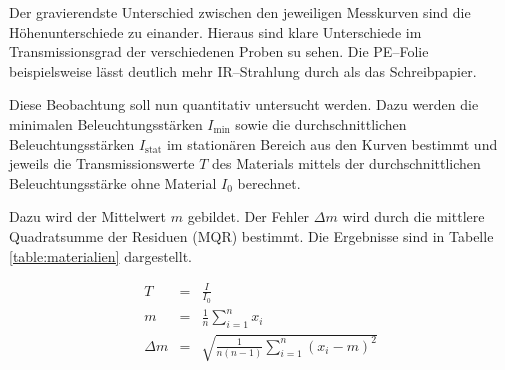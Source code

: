 \documentclass[12pt,a4paper]{scrartcl}
\numberwithin{equation}{section} %
\begin{document}
	Der gravierendste Unterschied zwischen den jeweiligen Messkurven sind die Höhenunterschiede zu einander. Hieraus sind klare Unterschiede im Transmissionsgrad der verschiedenen Proben su sehen. Die PE--Folie beispielsweise lässt deutlich mehr IR--Strahlung durch als das Schreibpapier.
	
	Diese Beobachtung soll nun quantitativ untersucht werden. Dazu werden die minimalen Beleuchtungsstärken $I_\mathrm{min}$ sowie die durchschnittlichen Beleuchtungsstärken $I_\mathrm{stat}$ im stationären Bereich aus den Kurven bestimmt und jeweils die Transmissionswerte $T$ des Materials mittels der durchschnittlichen Beleuchtungsstärke ohne Material $I_0$ berechnet.
	
	Dazu wird der Mittelwert $m$ gebildet. Der Fehler $\Delta m$ wird durch die mittlere Quadratsumme der Residuen (MQR) bestimmt. Die Ergebnisse sind in Tabelle \ref{table:materialien} dargestellt.
	
	\begin{eqnarray}
		T &=& \frac{I}{I_0} \\
		m &=& \frac{1}{n} \sum_{i=1}^{n} x_i \\
		\Delta m &=& \sqrt{\frac{1}{n (n-1)} \sum_{i=1}^{n} (x_i - m)^2}
	\end{eqnarray}
	
\end{document}
